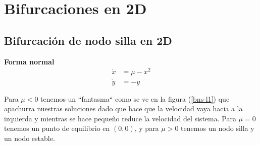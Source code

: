 \section{Bifurcaciones en 2D}

\subsection{Bifurcación de nodo silla en 2D}

\textbf{Forma normal}
$$\begin{aligned}
		\dot{x} &= \mu-x^2 \\
	\dot{y} &= -y
  \end{aligned}$$

	Para $ \mu<0$ tenemos un ``fantasma`` como se ve en la figura (\ref{bns-l1}) que apachurra nuestras soluciones dado que hace que la velocidad vaya hacia a la izquierda y mientras se hace pequeño reduce la velocidad del sistema. Para $ \mu=0$ tenemos un punto de equilibrio en $(0,0)$, y para $ \mu>0$ tenemos un nodo silla y un nodo estable. 
\begin{figure}[H]
 \centering
		\caption{}
 \label{}
\end{figure}



